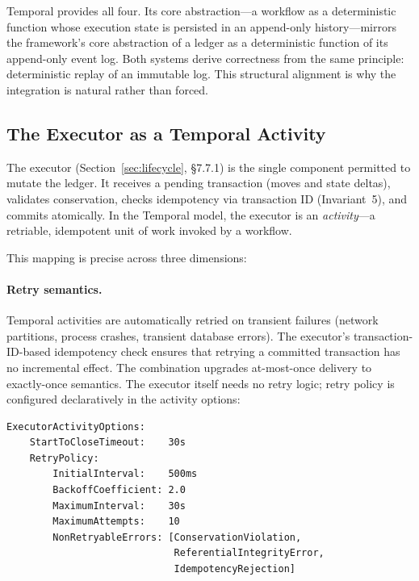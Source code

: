 \documentclass[11pt,a4paper]{article}
\begin{document}
\noindent Temporal provides all four. Its core abstraction---a workflow as a deterministic function whose execution state is persisted in an append-only history---mirrors the framework's core abstraction of a ledger as a deterministic function of its append-only event log. Both systems derive correctness from the same principle: deterministic replay of an immutable log. This structural alignment is why the integration is natural rather than forced.

\subsection{The Executor as a Temporal Activity}
\label{sec:executor-activity}

The executor (Section~\ref{sec:lifecycle}, \S7.7.1) is the single component permitted to mutate the ledger. It receives a pending transaction (moves and state deltas), validates conservation, checks idempotency via transaction ID (Invariant~5), and commits atomically. In the Temporal model, the executor is an \emph{activity}---a retriable, idempotent unit of work invoked by a workflow.

This mapping is precise across three dimensions:

\paragraph{Retry semantics.} Temporal activities are automatically retried on transient failures (network partitions, process crashes, transient database errors). The executor's transaction-ID-based idempotency check ensures that retrying a committed transaction has no incremental effect. The combination upgrades at-most-once delivery to exactly-once semantics. The executor itself needs no retry logic; retry policy is configured declaratively in the activity options:

\begin{lstlisting}
ExecutorActivityOptions:
    StartToCloseTimeout:    30s
    RetryPolicy:
        InitialInterval:    500ms
        BackoffCoefficient: 2.0
        MaximumInterval:    30s
        MaximumAttempts:    10
        NonRetryableErrors: [ConservationViolation,
                             ReferentialIntegrityError,
                             IdempotencyRejection]
\end{lstlisting}
\end{document}
